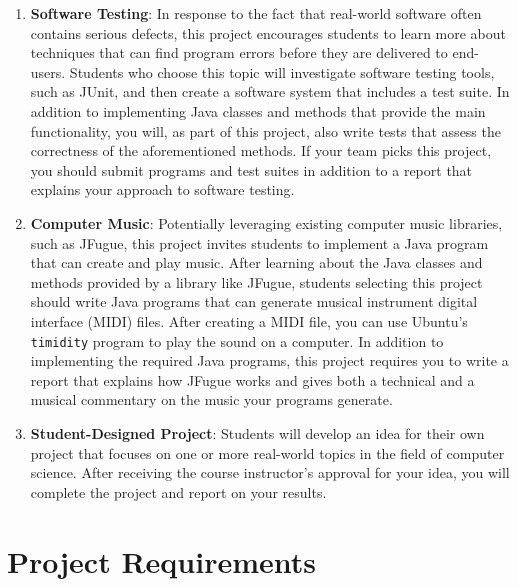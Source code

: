 \begin{enumerate}
  \item {\bf Software Testing}: In response to the fact that real-world software often contains serious defects, this
    project encourages students to learn more about techniques that can find program errors before they are delivered to
    end-users. Students who choose this topic will investigate software testing tools, such as JUnit, and then create
    a software system that includes a test suite. In addition to implementing Java classes and methods that provide the
    main functionality, you will, as part of this project, also write tests that assess the correctness of the
    aforementioned methods. If your team picks this project, you should submit programs and test suites in
    addition to a report that explains your approach to software testing.

  \item {\bf Computer Music}: Potentially leveraging existing computer music libraries, such as JFugue, this project
    invites students to implement a Java program that can create and play music. After learning about the Java classes
    and methods provided by a library like JFugue, students selecting this project should write Java programs that can
    generate musical instrument digital interface (MIDI) files. After creating a MIDI file, you can use Ubuntu's {\tt
      timidity} program to play the sound on a computer. In addition to implementing the required Java programs, this
    project requires you to write a report that explains how JFugue works and gives both a technical and a musical
    commentary on the music your programs generate.

  \item {\bf Student-Designed Project}: Students will develop an idea for their own project that focuses on one or more
    real-world topics in the field of computer science. After receiving the course instructor's approval for your idea,
    you will complete the project and report on your results.

\end{enumerate}

\vspace*{-.15in}

\section*{Project Requirements}


